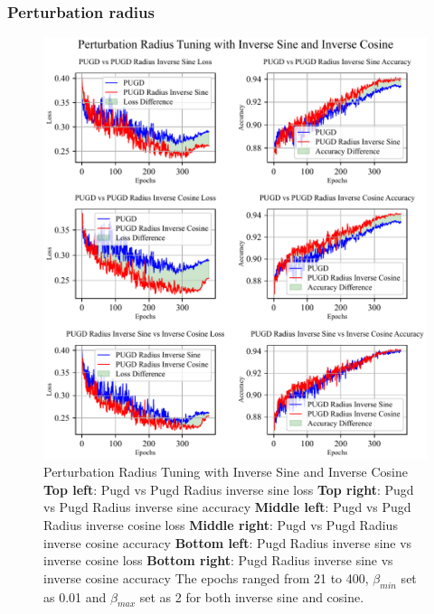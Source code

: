\documentclass[10pt,twocolumn,letterpaper]{article}
\begin{document}
\subsubsection{Perturbation radius}
\label{subsec:4.1.1}

\begin{figure}[htbp]
	\center
	\vspace{-10pt} 
	\includegraphics[width=\columnwidth]{images/PUGDRadiusInv.pdf}
	\caption{Perturbation Radius Tuning with Inverse Sine and Inverse Cosine
	\textbf{Top left}: Pugd vs Pugd Radius inverse sine loss \textbf{Top right}: Pugd vs Pugd Radius inverse sine accuracy
    \textbf{Middle left}: Pugd vs Pugd Radius inverse cosine loss \textbf{Middle right}: Pugd vs Pugd Radius inverse cosine accuracy
	\textbf{Bottom left}: Pugd Radius inverse sine vs inverse cosine loss \textbf{Bottom right}: Pugd Radius inverse sine vs inverse cosine accuracy
	The epochs ranged from 21 to 400, $\beta_{min}$ set as 0.01 and $\beta_{max}$ set as 2 for both inverse sine and cosine.
	}
	\label{fig:PUGDRadiusInv}
\end{figure}
\end{document}
